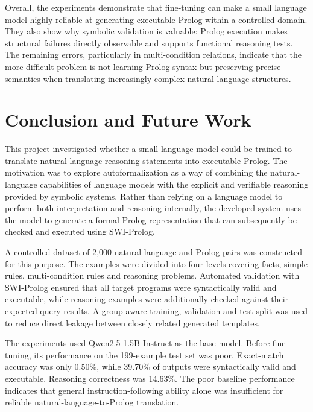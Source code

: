 \documentclass[11pt]{article} %
\theoremstyle{plain}
\theoremstyle{definition}
\begin{document}
Overall, the experiments demonstrate that fine-tuning can make a small
language model highly reliable at generating executable Prolog within a
controlled domain. They also show why symbolic validation is valuable:
Prolog execution makes structural failures directly observable and supports
functional reasoning tests. The remaining errors, particularly in
multi-condition relations, indicate that the more difficult problem is not
learning Prolog syntax but preserving precise semantics when translating
increasingly complex natural-language structures.

\clearpage
\section{Conclusion and Future Work}

This project investigated whether a small language model could be trained to
translate natural-language reasoning statements into executable Prolog. The
motivation was to explore autoformalization as a way of combining the
natural-language capabilities of language models with the explicit and
verifiable reasoning provided by symbolic systems. Rather than relying on a
language model to perform both interpretation and reasoning internally, the
developed system uses the model to generate a formal Prolog representation
that can subsequently be checked and executed using SWI-Prolog.

A controlled dataset of 2,000 natural-language and Prolog pairs was constructed
for this purpose. The examples were divided into four levels covering facts,
simple rules, multi-condition rules and reasoning problems. Automated
validation with SWI-Prolog ensured that all target programs were syntactically
valid and executable, while reasoning examples were additionally checked
against their expected query results. A group-aware training, validation and
test split was used to reduce direct leakage between closely related generated
templates.

The experiments used Qwen2.5-1.5B-Instruct as the base model. Before
fine-tuning, its performance on the 199-example test set was poor. Exact-match
accuracy was only 0.50\%, while 39.70\% of outputs were syntactically valid and
executable. Reasoning correctness was 14.63\%. The poor baseline performance
indicates that general instruction-following ability alone was insufficient for
reliable natural-language-to-Prolog translation.
\end{document}

